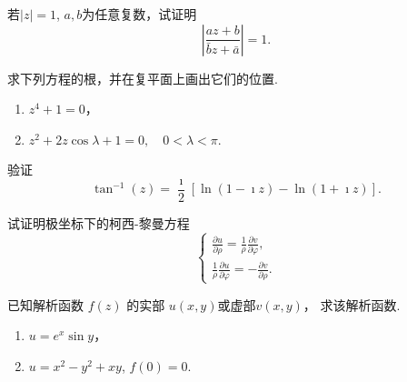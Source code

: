 \documentclass[10pt]{article}
\newenvironment{problem}[2][]{\begin{trivlist}
\item[\hskip \labelsep {\bfseries #1}\hskip \labelsep {\bfseries #2}]}{\end{trivlist}}
\begin{document}
\begin{problem}{1.4}
  若$|z|=1$, $a,b$为任意复数，试证明
  $$
  \left| \frac{a z + b}{\bar{b} z + \bar{a}} \right| = 1 .
  $$
\end{problem}


\begin{problem}{1.5}
  求下列方程的根，并在复平面上画出它们的位置.
  \begin{enumerate}
    \item $z^4 + 1 = 0$，
    \item $z^2 + 2 z \cos \lambda + 1 = 0, \quad 0 < \lambda < \pi$.
  \end{enumerate}
\end{problem}

\begin{problem}{1.6}
验证
$$
\tan^{-1}(z)=\frac{\imath }{2}[\ln (1-\imath z)-\ln (1+\imath z)] .
$$
\end{problem}


\begin{problem}{1.7}
  试证明极坐标下的柯西-黎曼方程
  $$
    \left\{\begin{array}{l}
    \frac{\partial u}{\partial \rho}=\frac{1}{\rho} \frac{\partial v}{\partial \varphi} ,\\
    \frac{1}{\rho} \frac{\partial u}{\partial \varphi}=-\frac{\partial v}{\partial \rho} .
    \end{array}\right.
  $$
\end{problem}

\begin{problem}{1.8}
  已知解析函数 $f(z)$  的实部 $u(x, y)$或虚部$ v(x, y)$， 求该解析函数.
  \begin{enumerate}
    \item $u = e^x \sin{y}$，
    \item $u = x^2 - y^2 + xy$, $f(0) = 0$.
  \end{enumerate}
\end{problem}

\end{document}
